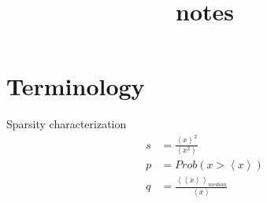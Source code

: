 \documentclass[a4paper,12pt]{article}
\newcommand{\avg}[1]{\left\langle #1 \right\rangle}
\begin{document}
\title{notes}
\section{Terminology}
Sparsity characterization \cite{Stotland:2010:PRB} 
\begin{align}
s &= \frac{\avg{x}^2}{\avg{x^2}}  \\
p &= Prob(x>\avg{x})  \\
q &= \frac{\avg{\avg{x}}_{median}}{\avg{x}}
\end{align}


\end{document}
